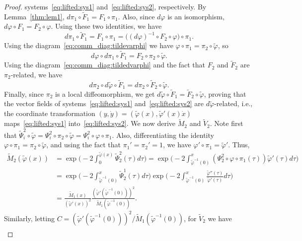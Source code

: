 \begin{proof}
	systems~\eqref{eq:lifted:sys1} and~\eqref{eq:lifted:sys2},
	respectively. By Lemma~\ref{thm:lem1}, $d \pi_1 \circ \tilde F_1=F_1
	\circ \pi_1$.  Also, since $d \varphi$ is an isomorphism, $d \varphi
	\circ F_1 = F_2 \circ \varphi$. Using these two identities, we have
				\[
	d\pi_1 \circ \tilde F_1 = F_1 \circ \pi_1 = \big( (d \varphi)^{-1} \circ
	F_2 \circ \varphi \big) \circ \pi_1.
	\]
				Using the diagram~\eqref{eq:comm_diag:tildevarphi} we have $\varphi
	\circ \pi_1 = \pi_2 \circ \tilde \varphi$, so
				\[
	d \varphi \circ d \pi_1 \circ \tilde F_1 = F_2 \circ \pi_2 \circ
	\tilde \varphi.
	\]
				Using the diagram~\eqref{eq:comm_diag:tildedvarphi} and the fact that
	$F_2$ and $\tilde F_2$ are $\pi_2$-related, we have
				\[
	d \pi_2 \circ d \tilde \varphi \circ \tilde F_1 = d \pi_2 \circ \tilde
	F_2 \circ \tilde \varphi.
	\]
				Finally, since $\pi_2$ is a local diffeomorphism, we get $d \tilde
	\varphi \circ \tilde F_1 = \tilde F_2 \circ \tilde \varphi$, proving
	that the vector fields of systems~\eqref{eq:lifted:sys1}
	and~\eqref{eq:lifted:sys2} are $d \tilde \varphi$-related, i.e., the
	coordinate transformation $(y,\dot y) =(\tilde \varphi(x),\tilde
	\varphi'(x) \dot x)$ maps~\eqref{eq:lifted:sys1}
	into~\eqref{eq:lifted:sys2}. We now derive $\tilde M_2$ and $\tilde
	V_2$. Note first that $\tilde \Psi_i^2 \circ \tilde \varphi = \Psi_i^2
	\circ \pi_2 \circ \tilde \varphi = \Psi_i^2 \circ \varphi \circ
	\pi_1$. Also, differentiating the identity $\varphi \circ \pi_1 =
	\pi_2 \circ \tilde \varphi$, and using the fact that $\pi_1 ' =
	\pi_2'=1$, we have $\varphi' \circ \pi_1 = \tilde \varphi'$. Thus,
		\[
	\begin{aligned} 
	\tilde M_2(\tilde \varphi(x)) &= \exp\Bigg( -2 \int_0^{\tilde
		\varphi(x)} \tilde \Psi^2_2(\tau) d \tau \Bigg) = \exp\Big( -2
	\int_{\tilde \varphi^{-1}(0)}^{x} (\Psi_2^2 \circ \varphi \circ
	\pi_1(\tau)) \tilde \varphi'(\tau) d \tau \Big) \\
		&=\exp\Big( -2 \int_{\tilde \varphi^{-1}(0)}^{x} \tilde \Psi_2^1(\tau)
	d \tau \Big)\exp\Big( -2 \int_{\tilde \varphi^{-1}(0)}^{x}
	\frac{\tilde \varphi''(\tau)}{\tilde \varphi'(\tau)} d
	\tau\Big) \\
		& = \frac{\tilde M_1(x)}{(\tilde \varphi'(x))^2} \frac{(\tilde
		\varphi'(\tilde \varphi^{-1}(0)))^2}{\tilde M_1(\tilde \varphi^{-1}(0))}.
	\end{aligned}
	\]
				Similarly, letting $C = (\tilde \varphi'(\tilde \varphi^{-1}(0)))^2 /
	\tilde M_1(\tilde \varphi^{-1}(0))$, for $\tilde V_2$ we have
				\[
	\begin{aligned}

\end{aligned}\]
\end{proof}
